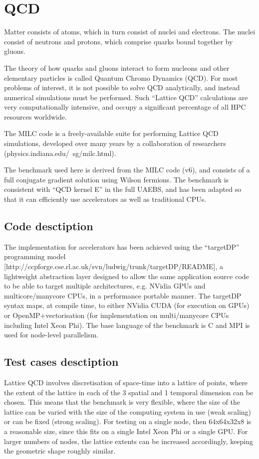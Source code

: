 \section{QCD}

Matter consists of atoms, which in turn consist of nuclei and electrons. The nuclei consist of neutrons and protons, which comprise quarks bound together by gluons.

The theory of how quarks and gluons interact to form nucleons and other elementary particles is called Quantum Chromo Dynamics (QCD). For most problems of interest, it is not possible to solve QCD analytically, and instead numerical simulations must be performed. Such “Lattice QCD” calculations are very computationally intensive, and occupy a significant percentage of all HPC resources worldwide.

The MILC code is a freely-available suite for performing Lattice QCD simulations, developed over many years by a collaboration of researchers (physics.indiana.edu/~sg/milc.html).

The benchmark used here is derived from the MILC code (v6), and consists of a full conjugate gradient solution using Wilson fermions. The benchmark is consistent with “QCD kernel E” in the full UAEBS, and has been adapted so that it can efficiently use accelerators as well as traditional CPUs.

\subsection{Code desctiption}
The implementation for accelerators has been achieved using the “targetDP” programming model [http://ccpforge.cse.rl.ac.uk/svn/ludwig/trunk/targetDP/README], a lightweight abstraction layer designed to allow the same application source code to be able to target multiple architectures, e.g. NVidia GPUs and multicore/manycore CPUs, in a performance portable manner. The targetDP syntax maps, at compile time, to either NVidia CUDA (for execution on GPUs) or OpenMP+vectorisation (for implementation on multi/manycore CPUs including Intel Xeon Phi). The base language of the benchmark is C and MPI is used for node-level parallelism.

\subsection{Test cases desctiption}
Lattice QCD involves discretisation of space-time into a lattice of points, where the extent of the lattice in each of the 3 spatial and 1 temporal dimension can be chosen. This means that the benchmark is very flexible, where the size of the lattice can be varied with the size of the computing system in use (weak scaling) or can be fixed (strong scaling). For testing on a single node, then 64x64x32x8 is a reasonable size, since this fits on a single Intel Xeon Phi or a single GPU. For larger numbers of nodes, the lattice extents can be increased accordingly, keeping the geometric shape roughly similar.


